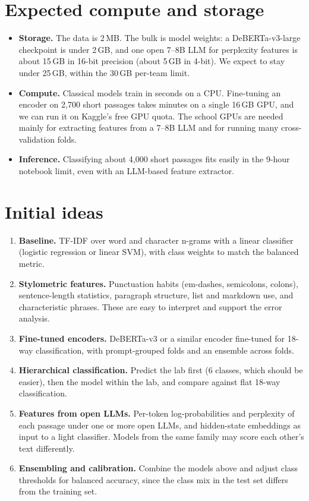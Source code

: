 \documentclass[11pt]{article}
\begin{document}
\section*{Expected compute and storage}
\begin{itemize}
  \item \textbf{Storage.} The data is 2\,MB. The bulk is model weights: a DeBERTa-v3-large
        checkpoint is under 2\,GB, and one open 7--8B LLM for perplexity features is about
        15\,GB in 16-bit precision (about 5\,GB in 4-bit). We expect to stay under 25\,GB, within
        the 30\,GB per-team limit.
  \item \textbf{Compute.} Classical models train in seconds on a CPU. Fine-tuning an encoder on
        2{,}700 short passages takes minutes on a single 16\,GB GPU, and we can run it on
        Kaggle's free GPU quota. The school GPUs are needed mainly for extracting features from
        a 7--8B LLM and for running many cross-validation folds.
  \item \textbf{Inference.} Classifying about 4{,}000 short passages fits easily in the 9-hour
        notebook limit, even with an LLM-based feature extractor.
\end{itemize}

\section*{Initial ideas}
\begin{enumerate}
  \item \textbf{Baseline.} TF-IDF over word and character n-grams with a linear classifier
        (logistic regression or linear SVM), with class weights to match the balanced metric.
  \item \textbf{Stylometric features.} Punctuation habits (em-dashes, semicolons, colons),
        sentence-length statistics, paragraph structure, list and markdown use, and
        characteristic phrases. These are easy to interpret and support the error analysis.
  \item \textbf{Fine-tuned encoders.} DeBERTa-v3 or a similar encoder fine-tuned for 18-way
        classification, with prompt-grouped folds and an ensemble across folds.
  \item \textbf{Hierarchical classification.} Predict the lab first (6 classes, which should be
        easier), then the model within the lab, and compare against flat 18-way classification.
  \item \textbf{Features from open LLMs.} Per-token log-probabilities and perplexity of each
        passage under one or more open LLMs, and hidden-state embeddings as input to a light
        classifier. Models from the same family may score each other's text differently.
  \item \textbf{Ensembling and calibration.} Combine the models above and adjust class
        thresholds for balanced accuracy, since the class mix in the test set differs from
        the training set.
\end{enumerate}
\end{document}
